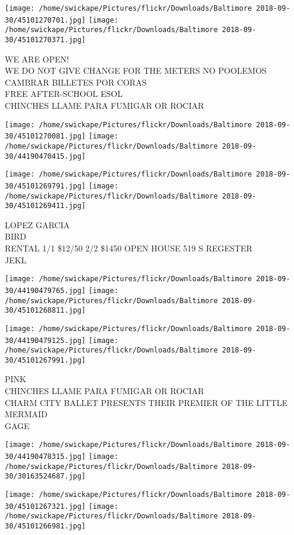 \documentclass[10pt,letterpaper]{article}
\begin{document}
\texttt{[image: /home/swickape/Pictures/flickr/Downloads/Baltimore 2018-09-30/45101270701.jpg]}
\texttt{[image: /home/swickape/Pictures/flickr/Downloads/Baltimore 2018-09-30/45101270371.jpg]}

WE ARE OPEN!\\
WE DO NOT GIVE CHANGE FOR THE METERS NO POOLEMOS CAMBRAR BILLETES POR CORAS\\
FREE AFTER{-}SCHOOL ESOL\\
CHINCHES LLAME PARA FUMIGAR OR ROCIAR\\
\pagebreak

\texttt{[image: /home/swickape/Pictures/flickr/Downloads/Baltimore 2018-09-30/45101270081.jpg]}
\texttt{[image: /home/swickape/Pictures/flickr/Downloads/Baltimore 2018-09-30/44190470415.jpg]}

\texttt{[image: /home/swickape/Pictures/flickr/Downloads/Baltimore 2018-09-30/45101269791.jpg]}
\texttt{[image: /home/swickape/Pictures/flickr/Downloads/Baltimore 2018-09-30/45101269411.jpg]}

LOPEZ GARCIA\\
BIRD\\
RENTAL 1/1 \$12/50 2/2 \$1450 OPEN HOUSE 519 S REGESTER\\
JEKL\\
\pagebreak

\texttt{[image: /home/swickape/Pictures/flickr/Downloads/Baltimore 2018-09-30/44190479765.jpg]}
\texttt{[image: /home/swickape/Pictures/flickr/Downloads/Baltimore 2018-09-30/45101268811.jpg]}

\texttt{[image: /home/swickape/Pictures/flickr/Downloads/Baltimore 2018-09-30/44190479125.jpg]}
\texttt{[image: /home/swickape/Pictures/flickr/Downloads/Baltimore 2018-09-30/45101267991.jpg]}

PINK\\
CHINCHES LLAME PARA FUMIGAR OR ROCIAR\\
CHARM CITY BALLET PRESENTS THEIR PREMIER OF THE LITTLE MERMAID\\
GAGE\\
\pagebreak

\texttt{[image: /home/swickape/Pictures/flickr/Downloads/Baltimore 2018-09-30/44190478315.jpg]}
\texttt{[image: /home/swickape/Pictures/flickr/Downloads/Baltimore 2018-09-30/30163524687.jpg]}

\texttt{[image: /home/swickape/Pictures/flickr/Downloads/Baltimore 2018-09-30/45101267321.jpg]}
\texttt{[image: /home/swickape/Pictures/flickr/Downloads/Baltimore 2018-09-30/45101266981.jpg]}
\end{document}
